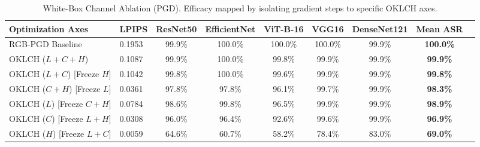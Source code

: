 \begin{table}[htbp]
\centering
\small
\caption{White-Box Channel Ablation (PGD). Efficacy mapped by isolating gradient steps to specific OKLCH axes.}
\label{tab:channel_ablation}
\begin{adjustbox}{max width=\linewidth}
\begin{tabular}{@{}llccccccc@{}}
\toprule
\textbf{Optimization Axes} & \textbf{LPIPS} & \textbf{ResNet50} & \textbf{EfficientNet} & \textbf{ViT-B-16} & \textbf{VGG16} & \textbf{DenseNet121} & \textbf{Mean ASR} \\ \midrule
RGB-PGD Baseline & 0.1953 & 99.9\% & 100.0\% & 100.0\% & 100.0\% & 99.9\% & \textbf{100.0\%} \\
OKLCH ($L+C+H$) & 0.1087 & 99.9\% & 100.0\% & 99.8\% & 99.9\% & 99.9\% & \textbf{99.9\%} \\
OKLCH ($L+C$) [Freeze $H$] & 0.1042 & 99.8\% & 100.0\% & 99.6\% & 99.9\% & 99.9\% & \textbf{99.8\%} \\
OKLCH ($C+H$) [Freeze $L$] & 0.0361 & 97.8\% & 97.8\% & 96.1\% & 99.7\% & 99.9\% & \textbf{98.3\%} \\
OKLCH ($L$) [Freeze $C+H$] & 0.0784 & 98.6\% & 99.8\% & 96.5\% & 99.9\% & 99.9\% & \textbf{98.9\%} \\
OKLCH ($C$) [Freeze $L+H$] & 0.0308 & 96.0\% & 96.4\% & 92.6\% & 99.6\% & 99.9\% & \textbf{96.9\%} \\
OKLCH ($H$) [Freeze $L+C$] & 0.0059 & 64.6\% & 60.7\% & 58.2\% & 78.4\% & 83.0\% & \textbf{69.0\%} \\
\bottomrule
\end{tabular}
\end{adjustbox}
\end{table}

